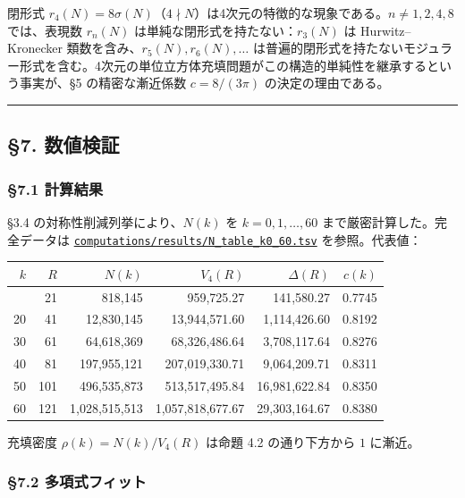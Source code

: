 \documentclass[a4paper,11pt]{ltjsarticle}
\theoremstyle{definition}
\begin{document}
閉形式
\(r_4(N) = 8\sigma(N)\)（\(4 \nmid N\)）は4次元の特徴的な現象である。\(n \neq 1, 2, 4, 8\)
では、表現数 \(r_n(N)\) は単純な閉形式を持たない：\(r_3(N)\) は
Hurwitz--Kronecker 類数を含み、\(r_5(N), r_6(N), \ldots\)
は普遍的閉形式を持たないモジュラー形式を含む。4次元の単位立方体充填問題がこの構造的単純性を継承するという事実が、§5
の精密な漸近係数 \(c = 8/(3\pi)\) の決定の理由である。

\begin{center}\rule{0.5\linewidth}{0.5pt}\end{center}

\subsection{§7. 数値検証}\label{ux6570ux5024ux691cux8a3c}

\subsubsection{§7.1 計算結果}\label{ux8a08ux7b97ux7d50ux679c}

§3.4 の対称性削減列挙により、\(N(k)\) を \(k = 0, 1, \ldots, 60\)
まで厳密計算した。完全データは
\href{../../computations/results/N_table_k0_60.tsv}{\texttt{computations/results/N\_table\_k0\_60.tsv}}
を参照。代表値：

{\def\LTcaptype{none} %
\begin{longtable}[]{@{}rrrrrr@{}}
\toprule\noalign{}
\(k\) & \(R\) & \(N(k)\) & \(V_4(R)\) & \(\Delta(R)\) & \(c(k)\) \\
\midrule\noalign{}
\endhead
\bottomrule\noalign{}
\endlastfoot
10 & 21 & 818,145 & 959,725.27 & 141,580.27 & 0.7745 \\
20 & 41 & 12,830,145 & 13,944,571.60 & 1,114,426.60 & 0.8192 \\
30 & 61 & 64,618,369 & 68,326,486.64 & 3,708,117.64 & 0.8276 \\
40 & 81 & 197,955,121 & 207,019,330.71 & 9,064,209.71 & 0.8311 \\
50 & 101 & 496,535,873 & 513,517,495.84 & 16,981,622.84 & 0.8350 \\
60 & 121 & 1,028,515,513 & 1,057,818,677.67 & 29,303,164.67 & 0.8380 \\
\end{longtable}
}

充填密度 \(\rho(k) = N(k)/V_4(R)\) は命題 4.2 の通り下方から \(1\)
に漸近。

\subsubsection{§7.2
多項式フィット}\label{ux591aux9805ux5f0fux30d5ux30a3ux30c3ux30c8}
\end{document}
